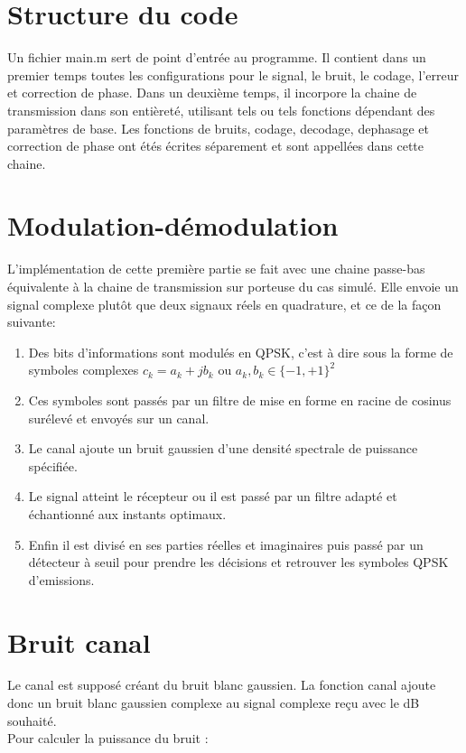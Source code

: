 \documentclass[a4paper,11pt]{article}
\begin{document}
\section{Structure du code}
Un fichier main.m sert de point d'entrée au programme. Il contient dans un premier temps toutes les configurations pour le signal, le bruit, le codage, l'erreur et correction de phase. Dans un deuxième temps, il incorpore la chaine de transmission dans son entièreté, utilisant tels ou tels fonctions dépendant des paramètres de base. Les fonctions de bruits, codage, decodage, dephasage et correction de phase ont étés écrites séparement et sont appellées dans cette chaine. 




\section{Modulation-démodulation}
L'implémentation de cette première partie se fait avec une chaine passe-bas équivalente à la chaine de transmission sur porteuse du cas simulé. Elle envoie un signal complexe plutôt que deux signaux réels en quadrature, et ce de la façon suivante:
\begin{enumerate}
	\item Des bits d'informations sont modulés en QPSK, c'est à dire sous la forme de symboles complexes $c_k=a_k+jb_k$ ou $a_k,b_k \in \{-1,+1\}^2$
	\item Ces symboles sont passés par un filtre de mise en forme en racine de cosinus surélevé et envoyés sur un canal.
	\item Le canal ajoute un bruit gaussien d'une densité spectrale de puissance spécifiée.
	\item Le signal atteint le récepteur ou il est passé par un filtre adapté et échantionné aux instants optimaux.
	\item Enfin il est divisé en ses parties réelles et imaginaires puis passé par un détecteur à seuil pour prendre les décisions et retrouver les symboles QPSK d'emissions.
\end{enumerate}


\section{Bruit canal}
Le canal est supposé créant du bruit blanc gaussien. La fonction canal ajoute donc un bruit blanc gaussien complexe au signal complexe reçu avec le dB souhaité. \\
Pour calculer la puissance du bruit : 
\end{document}
